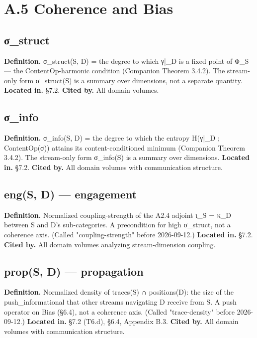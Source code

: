 \documentclass[11pt, openany]{book}
\newcommand{\sectionbreak}{\clearpage}
\begin{document}
\sectionbreak

\section{A.5 Coherence and Bias}

\subsection{σ\_\allowbreak{}struct}
\textbf{Definition.} σ\_\allowbreak{}struct(S, D) = the degree to which γ|\_\allowbreak{}D is a fixed point of Φ\_\allowbreak{}S --- the ContentOp-harmonic condition (Companion Theorem 3.4.2). The stream-only form σ\_\allowbreak{}struct(S) is a summary over dimensions, not a separate quantity.
\textbf{Located in.} §7.2.
\textbf{Cited by.} All domain volumes.

\subsection{σ\_\allowbreak{}info}
\textbf{Definition.} σ\_\allowbreak{}info(S, D) = the degree to which the entropy H(γ|\_\allowbreak{}D ; ContentOp(σ)) attains its content-conditioned minimum (Companion Theorem 3.4.2). The stream-only form σ\_\allowbreak{}info(S) is a summary over dimensions.
\textbf{Located in.} §7.2.
\textbf{Cited by.} All domain volumes with communication structure.

\subsection{eng(S, D) --- engagement}
\textbf{Definition.} Normalized coupling-strength of the A2.4 adjoint ι\_\allowbreak{}S ⊣ κ\_\allowbreak{}D between S and D's sub-categories. A precondition for high σ\_\allowbreak{}struct, not a coherence axis. (Called "coupling-strength" before 2026-09-12.)
\textbf{Located in.} §7.2.
\textbf{Cited by.} All domain volumes analyzing stream-dimension coupling.

\subsection{prop(S, D) --- propagation}
\textbf{Definition.} Normalized density of traces(S) ∩ positions(D): the size of the push\_\allowbreak{}informational that other streams navigating D receive from S. A push operator on Bias (§6.4), not a coherence axis. (Called "trace-density" before 2026-09-12.)
\textbf{Located in.} §7.2 (T6.d), §6.4, Appendix B.3.
\textbf{Cited by.} All domain volumes with communication structure.
\end{document}
